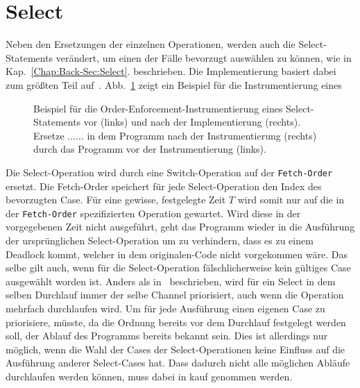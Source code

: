 \section{Select}\label{Chap:Inst-Sec:Select}
Neben den Ersetzungen der einzelnen Operationen, werden auch die Select-Statements 
verändert, um einen der Fälle bevorzugt auswählen zu können, wie in Kap.~\ref{Chap:Back-Sec:Select}.
beschrieben. Die Implementierung basiert dabei zum größten Teil auf~\cite{gfuzz}.
Abb.~\ref{Chap:Analyze-Sec:Channel-SubSec:Select-Fig:GFuzz_Inst} zeigt ein 
Beispiel für die Instrumentierung eines 
\begin{figure}[h!]
  \begin{minipage}[t]{0.3\textwidth}
    
  \end{minipage}
  \begin{minipage}[t]{0.65\textwidth}
    
  \end{minipage}
  \caption{Beispiel für die Order-Enforcement-Instrumentierung eines Select-Statements 
  vor (links) und nach der Implementierung (rechts). Ersetze $......$
  in dem Programm nach der Instrumentierung (rechts) durch das Programm vor der 
  Instrumentierung (links).~\cite[gekürzt]{gfuzz}}
  \label{Chap:Analyze-Sec:Channel-SubSec:Select-Fig:GFuzz_Inst}
\end{figure}
Die Select-Operation wird durch eine Switch-Operation auf der \texttt{Fetch-Order}
ersetzt. Die Fetch-Order speichert für jede Select-Operation den Index des bevorzugten
Case. Für eine gewisse, festgelegte Zeit $T$ wird somit nur auf die in der 
\texttt{Fetch-Order} spezifizierten Operation gewartet. Wird diese in der 
vorgegebenen Zeit nicht ausgeführt, geht das Programm wieder in die Ausführung
der ursprünglichen Select-Operation um zu verhindern, dass es zu einem 
Deadlock kommt, welcher in dem originalen-Code nicht vorgekommen wäre.
Das selbe gilt auch, wenn für die Select-Operation fälschlicherweise kein 
gültiges Case ausgewählt worden ist. Anders als in~\cite{gfuzz} beschrieben,
wird für ein Select in dem selben Durchlauf immer der selbe Channel priorisiert, 
auch wenn die Operation mehrfach durchlaufen wird. Um für jede Ausführung einen
eigenen Case zu priorisiere, müsste, da die Ordnung bereits vor dem 
Durchlauf festgelegt werden soll, der Ablauf des Programms bereits 
bekannt sein. Dies ist allerdings nur möglich, wenn die Wahl der Cases der 
Select-Operationen keine Einfluss auf die Ausführung anderer Select-Cases 
hat. Dass dadurch nicht alle möglichen Abläufe durchlaufen werden können, 
muss dabei in kauf genommen werden.







